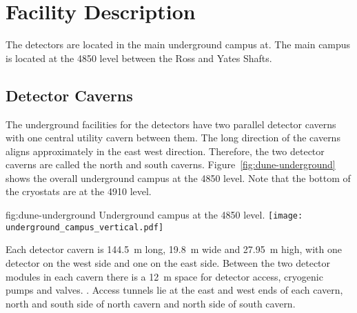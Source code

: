\chapter{Facility Description}
\label{vl:tc-facility}

The  detectors are located in the main underground campus at. The main campus is located at the 4850 level between the Ross and Yates Shafts.  

\section{Detector Caverns}
\label{sec:fdsp-coord-faci-caverns}


The underground facilities for the  detectors have two parallel
detector caverns with one central utility cavern between them. The
long direction of the caverns aligns approximately in the 
east west direction. Therefore, the two detector caverns are called the north
and south caverns. Figure~\ref{fig:dune-underground} shows the overall
underground campus at the  4850 level. Note that the bottom of the cryostats are at the 4910 level.
\begin{dunefigure}{fig:dune-underground}
  {Underground campus at the 4850 level.}
  \texttt{[image: underground\_campus\_vertical.pdf]}
\end{dunefigure}
Each detector cavern is \SI{144.5}{\meter} long, \SI{19.8}{\meter}
wide and \SI{27.95}{\meter} high, with one detector on the west side
and one on the east side. Between the two detector modules in each
cavern there is a \SI{12}{\meter} space for detector access, cryogenic pumps and valves.
. Access tunnels lie at the east and
west ends of each cavern, north and south side of north cavern and
north side of south cavern.

